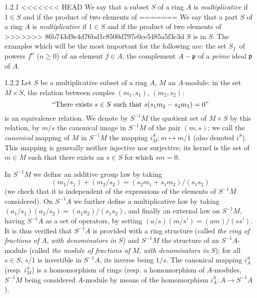 \documentclass[../main.tex]{subfiles}
\begin{document}
\begin{cx}{1.2.1}
<<<<<<< HEAD
We say that a subset $S$ of a ring $A$ is \emph{multiplicative} if $1\in S$ and if the product of two elements of
=======
We say that a part $S$ of a ring $A$ is \emph{multiplicative} if $1\in S$ and if the product of two elements of
>>>>>>> 86b743d9e4d76bd1c8500d797e0ce5485a5f3c3d
$S$ is in $S$. The examples which will be the most important for the following are:
 the set $S_f$ of powers $f^n$ ($n\geq 0$) of an element $f\in A$;
 the complement $A-\mathfrak{p}$ of a \emph{prime} ideal $\mathfrak{p}$ of $A$.
\end{cx}

\begin{cx}{1.2.2}
Let $S$ be a multiplicative subset of a ring $A$, $M$ an $A$-module; in the set $M\times S$, the relation between
couples $(m_1,s_1)$, $(m_2,s_2)$:
\[
   ``\text{There exists } s\in S\text{ such that } s(s_1 m_2-s_2 m_1)=0"
\]
is an equivalence relation. We denote by $S^{-1}M$ the quotient set of $M\times S$ by this relation, by $m/s$ the canonical
image in $S^{-1}M$ of the pair $(m,s)$; we call the \emph{canonical} mapping of $M$ in $S^{-1}M$ the mapping $i_M^S:m\mapsto m/1$
(also denoted $i^S$). This mapping is generally neither injective nor surjective; its kernel is the set of $m\in M$ such that there
exists an $s\in S$ for which $sm=0$.

In $S^{-1}M$ we define an additive group law by taking
\[
  (m_1/s_1)+(m_2/s_2)=(s_2 m_1+s_1 m_2)/(s_1 s_2)
\]
(we check that it is independent of the expressions of the elements of $S^{-1}M$ considered). On $S^{-1}A$ we further define
a multiplicative law by taking $(a_1/s_1)(a_2/s_2)=(a_1 a_2)/(s_1 s_2)$, and finally an external law on $S^{-1}M$, having
$S^{-1}A$ as a set of operators, by setting $(a/s)(m/s')=(am)/(ss')$. It is thus verified that $S^{-1}A$ is provided with a
ring structure (called \emph{the ring of fractions of} $A$, \emph{with denominators in} $S$) and $S^{-1}M$ the structure of
an $S^{-1}A$-module (called \emph{the  module of fractions of} $M$, \emph{with denominators in} $S$); for all $s\in S$,
$s/1$ is invertible in $S^{-1}A$, its inverse being $1/s$. The canonical mapping $i_A^S$ (resp. $i_M^S$) is a homomorphism
of rings (resp. a homomorphism of $A$-modules, $S^{-1}M$ being considered $A$-module by means of the homomorphism
$i_A^S:A\to S^{-1}A$).
\end{cx}
\end{document}
